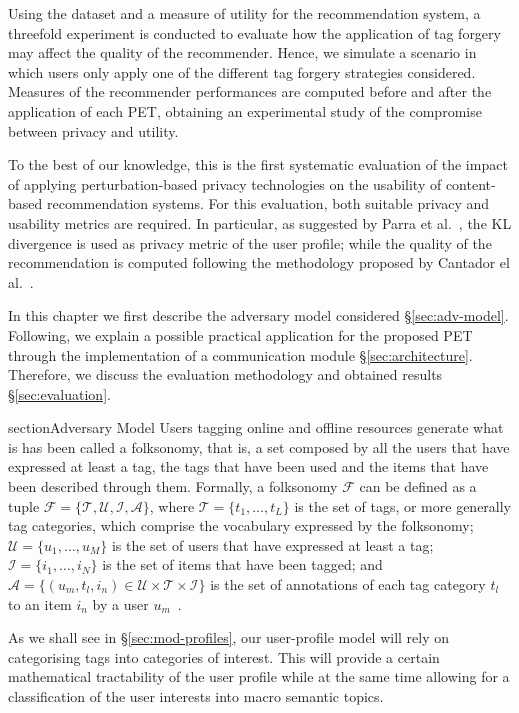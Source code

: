 Using the dataset and a measure of utility for the recommendation system, a threefold experiment is conducted to evaluate how the application of tag forgery may affect the quality of the recommender. Hence, we simulate a scenario in which users only apply one of the different tag forgery strategies considered. Measures of the recommender performances are computed before and after the application of each PET, obtaining an experimental study of the compromise between privacy and utility.

To the best of our knowledge, this is the first systematic evaluation of the impact of applying perturbation-based privacy technologies on the usability of content-based recommendation systems. For this evaluation, both suitable privacy and usability metrics are required. In particular, as suggested by Parra et al.~\cite{parra2014measuring}, the KL divergence is used as privacy metric of the user profile; while the quality of the recommendation is computed following the methodology proposed by Cantador el al.~\cite{a02}.

In this chapter we first describe the adversary model considered \S \ref{sec:adv-model}. Following, we explain a possible practical application for the proposed PET through the implementation of a communication module \S \ref{sec:architecture}. Therefore, we discuss the evaluation methodology and obtained results \S \ref{sec:evaluation}.

section{Adversary Model}
\label{sec:adv-model}
\noindent
Users tagging online and offline resources generate what is has been called a folksonomy, that is, a set composed by all the users that have expressed at least a tag, the tags that have been used and the items that have been described through them.
Formally, a folksonomy $\mathcal{F}$ can be defined as a tuple $\mathcal{F}=\{\mathcal{T},\mathcal{U},\mathcal{I},\mathcal{A}\}$, where $\mathcal{T}=\{t_1,\ldots,t_L\}$ is the set of tags, or more generally tag categories, which comprise the vocabulary expressed by the folksonomy; $\mathcal{U}=\{u_1,\ldots,u_M\}$ is the set of users that have expressed at least a tag; $\mathcal{I}=\{i_1,\ldots,i_N\}$ is the set of items that have been tagged; and $\mathcal{A}=\{(u_m, t_l, i_n) \in \mathcal{U} \times \mathcal{T} \times \mathcal{I} \}$ is the set of annotations of each tag category $t_l$ to an item $i_n$ by a user $u_m$~\cite{a02}.

As we shall see in \S \ref{sec:mod-profiles}, our user-profile model will rely on categorising tags into categories of interest. This will provide a certain mathematical tractability of the user profile while at the same time allowing for a classification of the user interests into macro semantic topics.

